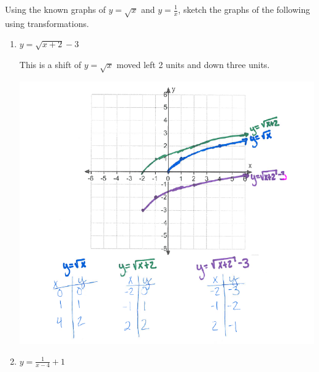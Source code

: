 \documentclass[nooutcomes]{ximera}
\begin{document}
\begin{problem}
Using the known graphs of $y=\sqrt{x}$ and $y=\frac{1}{x}$, sketch the graphs of the following using transformations.

\begin{enumerate}
 	\item $y=\sqrt{x+2}-3$
	\begin{freeResponse}
		This is a shift of $y=\sqrt{x}$ moved left 2 units and down three units.
	\begin{image}		
	\includegraphics[scale = 0.7]{Figure8.png}
	\end{image}
	\end{freeResponse}
	

	\item $y=\frac{1}{x-4}+1$


\end{enumerate}
\end{problem}
\end{document}

